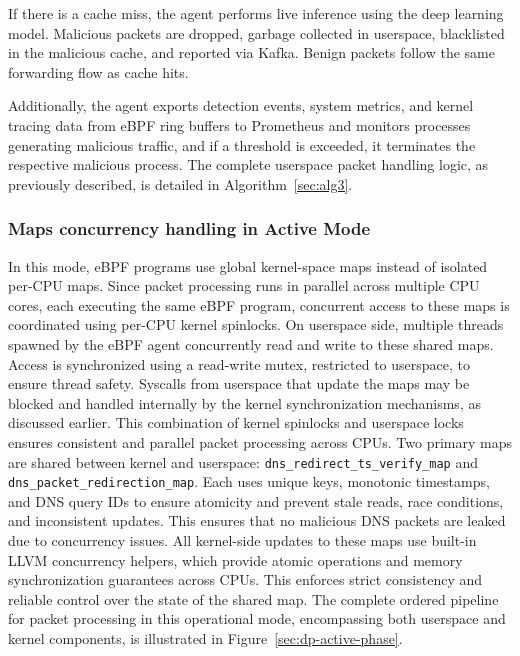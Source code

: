 \documentclass [11pt, proquest] {uwthesis}[2020/02/24]
\begin{document}
If there is a cache miss, the agent performs live inference using the deep learning model. Malicious packets are dropped, garbage collected in userspace, blacklisted in the malicious cache, and reported via Kafka. Benign packets follow the same forwarding flow as cache hits.

Additionally, the agent exports detection events, system metrics, and kernel tracing data from eBPF ring buffers to Prometheus and monitors processes generating malicious traffic, and if a threshold is exceeded, it terminates the respective malicious process. The complete userspace packet handling logic, as previously described, is detailed in Algorithm~\ref{sec:alg3}.

\subsubsection{\textbf{Maps concurrency handling in Active Mode}}
\label{active:sec3}
In this mode, eBPF programs use global kernel-space maps instead of isolated per-CPU maps. Since packet processing runs in parallel across multiple CPU cores, each executing the same eBPF program, concurrent access to these maps is coordinated using per-CPU kernel spinlocks. On userspace side, multiple threads spawned by the eBPF agent concurrently read and write to these shared maps. Access is synchronized using a read-write mutex, restricted to userspace, to ensure thread safety. Syscalls from userspace that update the maps may be blocked and handled internally by the kernel synchronization mechanisms, as discussed earlier. This combination of kernel spinlocks and userspace locks ensures consistent and parallel packet processing across CPUs. Two primary maps are shared between kernel and userspace: \texttt{dns\_redirect\_ts\_verify\_map} and \texttt{dns\_packet\_redirection\_map}. Each uses unique keys, monotonic timestamps, and DNS query IDs to ensure atomicity and prevent stale reads, race conditions, and inconsistent updates. This ensures that no malicious DNS packets are leaked due to concurrency issues. All kernel-side updates to these maps use built-in LLVM concurrency helpers, which provide atomic operations and memory synchronization guarantees across CPUs. This enforces strict consistency and reliable control over the state of the shared map. The complete ordered pipeline for packet processing in this operational mode, encompassing both userspace and kernel components, is illustrated in Figure~\ref{sec:dp-active-phase}.
\end{document}
